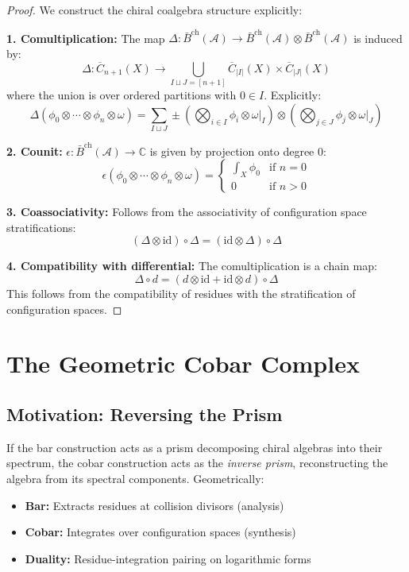 \begin{proof}
We construct the chiral coalgebra structure explicitly:

\textbf{1. Comultiplication:} The map $\Delta: \bar{B}^{\text{ch}}(\mathcal{A}) \to \bar{B}^{\text{ch}}(\mathcal{A}) \otimes \bar{B}^{\text{ch}}(\mathcal{A})$ is induced by:
\[
\Delta: \overline{C}_{n+1}(X) \to \bigcup_{I \sqcup J = [n+1]} \overline{C}_{|I|}(X) \times \overline{C}_{|J|}(X)
\]
where the union is over ordered partitions with $0 \in I$. Explicitly:
\[
\Delta(\phi_0 \otimes \cdots \otimes \phi_n \otimes \omega) = \sum_{I \sqcup J} \pm \left(\bigotimes_{i \in I} \phi_i \otimes \omega|_I\right) \otimes \left(\bigotimes_{j \in J} \phi_j \otimes \omega|_J\right)
\]

\textbf{2. Counit:} $\epsilon: \bar{B}^{\text{ch}}(\mathcal{A}) \to \mathbb{C}$ is given by projection onto degree 0:
\[
\epsilon(\phi_0 \otimes \cdots \otimes \phi_n \otimes \omega) = \begin{cases}
\int_X \phi_0 & \text{if } n = 0 \\
0 & \text{if } n > 0
\end{cases}
\]

\textbf{3. Coassociativity:} Follows from the associativity of configuration space stratifications:
\[
(\Delta \otimes \text{id}) \circ \Delta = (\text{id} \otimes \Delta) \circ \Delta
\]

\textbf{4. Compatibility with differential:} The comultiplication is a chain map:
\[
\Delta \circ d = (d \otimes \text{id} + \text{id} \otimes d) \circ \Delta
\]
This follows from the compatibility of residues with the stratification of configuration spaces.
\end{proof}

\section{The Geometric Cobar Complex}

\subsection{Motivation: Reversing the Prism}

\begin{remark}
If the bar construction acts as a prism decomposing chiral algebras into their spectrum, the cobar construction acts as the \emph{inverse prism}, reconstructing the algebra from its spectral components. Geometrically:
\begin{itemize}
\item \textbf{Bar:} Extracts residues at collision divisors (analysis)
\item \textbf{Cobar:} Integrates over configuration spaces (synthesis)
\item \textbf{Duality:} Residue-integration pairing on logarithmic forms
\end{itemize}
\end{remark}

